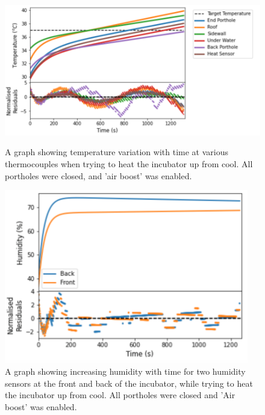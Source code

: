 \documentclass{article}
\begin{document}
\begin{figure}[H]
\centering
\begin{minipage}{.57\linewidth}
    \captionsetup{justification=centering,margin=0.7cm}
    \includegraphics[width=\textwidth]{closed air boost.png}
    \caption{A graph showing temperature variation with time at various thermocouples when trying to heat the incubator up from cool. All portholes were closed, and 'air boost' was enabled.}
\end{minipage}
\hfill
\begin{minipage}{.42\linewidth}
    \captionsetup{justification=centering,margin=0.1cm}
    \includegraphics[width=0.95\textwidth]{Humidity air boost cl;osed.png}
    \caption{A graph showing increasing humidity with time for two humidity sensors at the front and back of the incubator, while trying to heat the incubator up from cool. All portholes were closed and 'Air boost' was enabled.}
    \end{minipage}
\end{figure}
\end{document}
